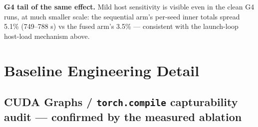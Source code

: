 \documentclass[11pt]{article}
\begin{document}
\textbf{G4 tail of the same effect.} Mild host sensitivity is visible even in the clean
G4 runs, at much smaller scale: the sequential arm's per-seed inner totals spread 5.1\%
(749--788 s) vs the fused arm's 3.5\% --- consistent with the launch-loop host-load
mechanism above.

\section{Baseline Engineering Detail}

\subsection{CUDA Graphs / \texttt{torch.compile} capturability audit --- confirmed by
the measured ablation}
\end{document}
